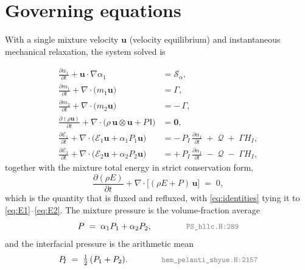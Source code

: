 \documentclass[11pt,a4paper]{article}
\newcommand{\dd}[2]{\frac{\partial #1}{\partial #2}}
\newcommand{\uvec}{\mathbf{u}}
\newcommand{\Ivec}{\mathsf{I}}
\newcommand{\code}[1]{\texttt{\small #1}}
\newcommand{\src}[1]{{\color{gray}\code{#1}}}
\begin{document}
\section{Governing equations}

With a single mixture velocity $\uvec$ (velocity equilibrium) and
instantaneous mechanical relaxation, the system solved is

\begin{align}
  \dd{\alpha_1}{t} + \uvec\!\cdot\!\nabla\alpha_1
    &= \mathcal{S}_{\alpha}, \label{eq:alpha}\\[2pt]
  \dd{m_1}{t} + \nabla\!\cdot\!\bigl(m_1\uvec\bigr)
    &= \Gamma, \label{eq:m1}\\[2pt]
  \dd{m_2}{t} + \nabla\!\cdot\!\bigl(m_2\uvec\bigr)
    &= -\,\Gamma, \label{eq:m2}\\[2pt]
  \dd{(\rho\uvec)}{t}
    + \nabla\!\cdot\!\bigl(\rho\,\uvec\!\otimes\!\uvec + P\,\Ivec\bigr)
    &= \mathbf{0}, \label{eq:mom}\\[2pt]
  \dd{\mathcal{E}_1}{t}
    + \nabla\!\cdot\!\bigl(\mathcal{E}_1\uvec + \alpha_1P_1\uvec\bigr)
    &= -\,P_{\!I}\,\dd{\alpha_1}{t}
       \;+\;\mathcal{Q}\;+\;\Gamma H_{\!I}, \label{eq:E1}\\[2pt]
  \dd{\mathcal{E}_2}{t}
    + \nabla\!\cdot\!\bigl(\mathcal{E}_2\uvec + \alpha_2P_2\uvec\bigr)
    &= +\,P_{\!I}\,\dd{\alpha_1}{t}
       \;-\;\mathcal{Q}\;-\;\Gamma H_{\!I}, \label{eq:E2}
\end{align}
%
together with the mixture total energy in strict conservation form,
\begin{equation}
  \dd{(\rho E)}{t}
    + \nabla\!\cdot\!\bigl[(\rho E + P)\,\uvec\bigr] \;=\; 0,
  \label{eq:etot}
\end{equation}
which is the quantity that is fluxed and refluxed, with
\eqref{eq:identities} tying it to \eqref{eq:E1}--\eqref{eq:E2}.  The mixture
pressure is the volume-fraction average
\begin{equation}
  P \;=\; \alpha_1P_1 + \alpha_2P_2,
  \qquad\qquad \src{PS\_hllc.H:289}
  \label{eq:pmix}
\end{equation}
and the interfacial pressure is the arithmetic mean
\begin{equation}
  P_{\!I} \;=\; \tfrac12\,(P_1+P_2).
  \qquad\qquad \src{hem\_pelanti\_shyue.H:2157}
  \label{eq:pint}
\end{equation}
\end{document}
